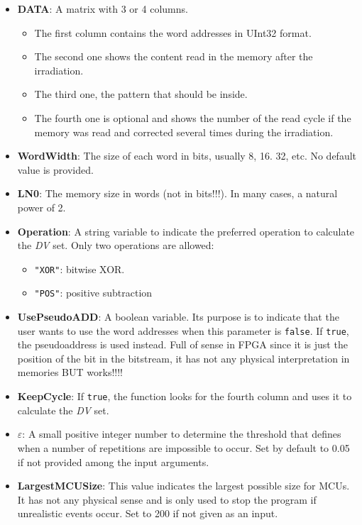 \begin{itemize}
\begin{itemize}
	 	\item   \textbf{DATA}: A matrix with 3 or 4 columns. 
	 	\begin{itemize}
	 		\item The first column contains the word addresses in UInt32 format.
	 		\item The second one shows the content read in the memory after the irradiation.
	 		\item The third one, the pattern that should be inside.
	 		\item  The fourth one is optional and shows the number of the read cycle if the   memory was read and corrected several times during the irradiation.
	 	\end{itemize}
	 	\item   \textbf{WordWidth}: The size of each word in bits, usually 8, 16. 32, etc. No default value is provided.
	 	\item   \textbf{LN0}: The memory size in words (not in bits!!!). In many cases, a natural power of 2.
	 	\item   \textbf{Operation}: A string variable to indicate the preferred operation to calculate
	 	the \textit{DV} set. Only two operations are allowed: 
	 	\begin{itemize}
	 		\item \texttt{"XOR"}: bitwise XOR.
	 		\item\texttt{"POS"}: positive subtraction
	 	\end{itemize}
	 	\item  \textbf{UsePseudoADD}: A boolean variable. Its purpose is to indicate that the user wants to use the word addresses when this parameter is \texttt{false}. If \texttt{true}, the pseudoaddress  is used instead. Full of sense in FPGA since it is just the position  of the bit in the bitstream, it has not any physical interpretation in memories BUT works!!!!
	 	\item   \textbf{KeepCycle}: If \texttt{true}, the function looks for the fourth column and uses it to calculate the \textit{DV} set.
	 	\item   \textbf{\(\varepsilon\)}: A small positive integer number to determine the threshold that defines when a number of repetitions are impossible to occur. Set by default to 0.05 if not provided among the input arguments.
	 	\item  \textbf{LargestMCUSize}: This value indicates the largest possible size for MCUs. It has not any physical sense  and is only used to stop the program if unrealistic events occur. Set to 200 if not given as an input.
	 	

\end{itemize}
\end{itemize}
